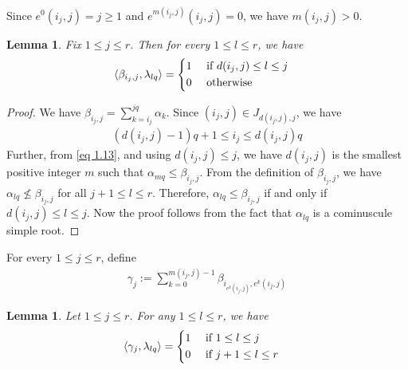 \documentclass[12pt,reqno]{amsart}
\numberwithin{equation}{section}
\newtheorem{lemma}[theorem]{Lemma}
\theoremstyle{definition}
\begin{document}
Since $e^{0}(i_{j},j)=j\geq 1$ and $e^{m(i_{j},j)}(i_{j},j)=0$, we have $m(i_{j},j)>0$.
\begin{lemma}\label{claim 1}
	Fix $1\leq j\leq r$. Then for every $1\leq l\leq r$, we have 
	\begin{align*}
		\langle \beta_{i_{j},j},\lambda_{lq}\rangle&=\begin{dcases}
			1&\text{ if }d(i_{j},j)\leq l\leq j\\
			0&\text{ otherwise} 
		\end{dcases}
	\end{align*}
\end{lemma}
\begin{proof}
	We have $\beta_{i_{j},j}=\sum_{k=i_{j}}^{jq}\alpha_{k}$.
	Since $(i_{j},j)\in J_{d(i_{j},j),j}$,  we have
	\begin{align}\label{eq 1.13}
		(d(i_{j},j)-1)q+1\leq i_{j}\leq d(i_{j},j)q
	\end{align}
	Further, from \cref{eq 1.13}, and using $d(i_{j},j)\leq j$, we have $d(i_{j},j)$ is the smallest positive integer $m$ such that $\alpha_{mq}\leq \beta_{i_{j},j}$. From the definition of $\beta_{i_{j},j}$, we have $\alpha_{lq}\nleq \beta_{i_{j},j}$ for all $j+1\leq l\leq r$. Therefore, $\alpha_{lq}\leq \beta_{i_{j},j}$ if and only if $d(i_{j},j)\leq l\leq j$. Now the proof follows from the fact that $\alpha_{lq}$ is a cominuscule simple root.
\end{proof}
For every $1\leq j\leq r$, define \begin{align}\label{eq 1.14}
	\gamma_{j}:=\sum_{k=0}^{m(i_{j},j)-1}\beta_{i_{e^{k}(i_{j},j)},e^{k}(i_{j},j)}
\end{align} 
\begin{lemma}\label{claim 4}
	Let $1\leq j\leq r$. 
	For any $1\leq l\leq r$, we have \begin{align*}
		\langle \gamma_{j},\lambda_{lq}\rangle &=	\begin{dcases}
			1& \text{ if } 1\leq l\leq j\\
			0& \text{ if }j+1\leq  l\leq r
		\end{dcases}
	\end{align*}
\end{lemma}
\end{document}
